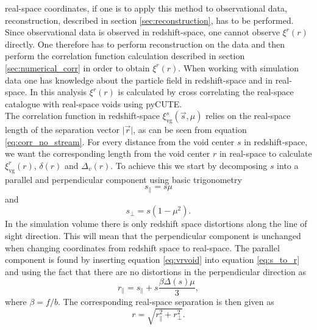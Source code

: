 real-space coordinates, if one is to apply this method to observational data,
reconstruction, described in section \ref{sec:reconstruction}, has to be performed. Since observational data is observed in
redshift-space, one cannot observe $\xi^r(r)$ directly. One therefore has to
perform reconstruction on the data and then perform the correlation function
calculation described in section \ref{sec:numerical_corr} in order to obtain
$\xi^r(r)$. When working with simulation data one has knowledge about the
particle field in redshift-space and in real-space. In this analysis $\xi^r(r)$ is calculated by cross correlating the real-space catalogue with real-space voids using pyCUTE. 
\\\indent
The correlation function in redshift-space $\xi^s_{\mathrm{vg}}(\vec{s},\mu)$
relies on the real-space length of the separation vector $\vert\vec{r}\vert$, as
can be seen from equation \ref{eq:corr_no_stream}. For every distance from the void center $s$ in
redshift-space, we want the corresponding length from the void center $r$ in
real-space to calculate $\xi^r_{\mathrm{vg}}(r)$, $\delta(r)$ and $\Delta_v(r)$.
To achieve this we start by decomposing $s$ into a parallel and perpendicular
component using basic trigonometry
\begin{equation}
    s_\parallel=s\mu
\end{equation}
and
\begin{equation}
    s_\perp=s(1-\mu^2).
\end{equation}
In the simulation volume there is only redshift space distortions along the line
of sight direction. This will mean that the perpendicular component is unchanged
when changing coordinates from redshift space to real-space. The parallel
component is found by inserting equation \ref{eq:vrvoid} into equation \ref{eq:s_to_r} and using the fact that there are no distortions in the perpendicular direction as
\begin{equation}
    r_\parallel=s_\parallel + s\frac{\beta\Delta(s)\mu}{3},
\end{equation}
where $\beta=f/b$.
The corresponding real-space separation is then given as
\begin{equation}
    r=\sqrt{r_\parallel^2+r_\perp^2}.
\end{equation}

